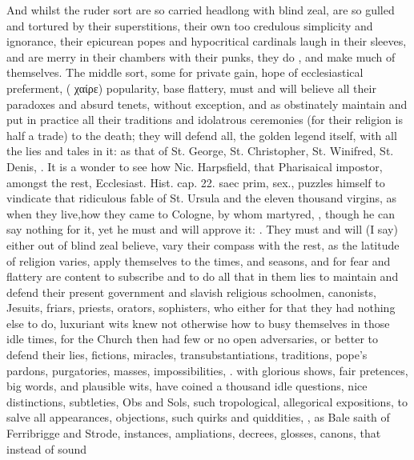 {And whilst the ruder sort are so carried headlong with blind zeal, are
so gulled and tortured by their superstitions, their own too credulous
simplicity and ignorance, their epicurean popes and hypocritical
cardinals laugh in their sleeves, and are merry in their chambers with
their punks, they do , and make much of themselves. The
middle sort, some for private gain, hope of ecclesiastical preferment,
( \textgreek{χαίρε}) popularity, base flattery, must
and will believe all their paradoxes and absurd tenets, without
exception, and as obstinately maintain and put in practice all their
traditions and idolatrous ceremonies (for their religion is half a
trade) to the death; they will defend all, the golden legend itself,
with all the lies and tales in it: as that of St. George, St.
Christopher, St. Winifred, St. Denis, \etc{}. It is a wonder to see how
Nic. Harpsfield, that Pharisaical impostor, amongst the rest,
Ecclesiast. Hist. \textlatin{cap. 22. saec prim, sex.}, puzzles himself to
vindicate that ridiculous fable of St. Ursula and the eleven thousand
virgins, as when they live,how they came to Cologne, by whom
martyred, \etc{}, though he can say nothing for it, yet he must and will
approve it: . They must and will (I say) either out of blind zeal believe,
vary their compass with the rest, as the latitude of religion varies,
apply themselves to the times, and seasons, and for fear and flattery
are content to subscribe and to do all that in them lies to maintain
and defend their present government and slavish religious schoolmen,
canonists, Jesuits, friars, priests, orators, sophisters, who either
for that they had nothing else to do, luxuriant wits knew not otherwise
how to busy themselves in those idle times, for the Church then had few
or no open adversaries, or better to defend their lies, fictions,
miracles, transubstantiations, traditions, pope's pardons, purgatories,
masses, impossibilities, \etc{}. with glorious shows, fair pretences, big
words, and plausible wits, have coined a thousand idle questions, nice
distinctions, subtleties, Obs and Sols, such tropological, allegorical
expositions, to salve all appearances, objections, such quirks and
quiddities, , as Bale saith of Ferribrigge and Strode,
instances, ampliations, decrees, glosses, canons, that instead of sound
}
